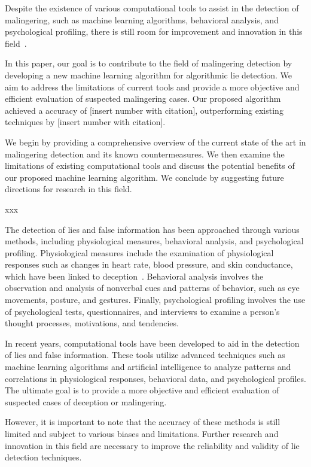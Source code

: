 \documentclass[onecolumn, compsoc,10pt]{IEEEtran}
\begin{document}
Despite the existence of various computational tools to assist in the detection of malingering, such as machine learning algorithms, behavioral analysis, and psychological profiling, there is still room for improvement and innovation in this field~\cite{rogers2008clinical}.

In this paper, our goal is to contribute to the field of malingering detection by developing a new machine learning algorithm for algorithmic lie detection. We aim to address the limitations of current tools and provide a more objective and efficient evaluation of suspected malingering cases. Our proposed algorithm achieved a accuracy of [insert number with citation], outperforming existing techniques by [insert number with citation].

We begin by providing a comprehensive overview of the current state of the art in malingering detection and its known countermeasures. We then examine the limitations of existing computational tools and discuss the potential benefits of our proposed machine learning algorithm. We conclude by suggesting future directions for research in this field.



xxx

The detection of lies and false information has been approached through various methods, including physiological measures, behavioral analysis, and psychological profiling. Physiological measures include the examination of physiological responses such as changes in heart rate, blood pressure, and skin conductance, which have been linked to deception~\cite{Ganslen1990}. Behavioral analysis involves the observation and analysis of nonverbal cues and patterns of behavior, such as eye movements, posture, and gestures. Finally, psychological profiling involves the use of psychological tests, questionnaires, and interviews to examine a person's thought processes, motivations, and tendencies.

In recent years, computational tools have been developed to aid in the detection of lies and false information. These tools utilize advanced techniques such as machine learning algorithms and artificial intelligence to analyze patterns and correlations in physiological responses, behavioral data, and psychological profiles. The ultimate goal is to provide a more objective and efficient evaluation of suspected cases of deception or malingering.

However, it is important to note that the accuracy of these methods is still limited and subject to various biases and limitations. Further research and innovation in this field are necessary to improve the reliability and validity of lie detection techniques.
\end{document}
